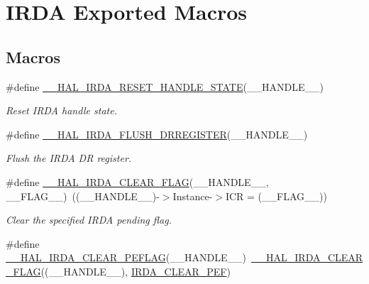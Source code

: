 \hypertarget{group___i_r_d_a___exported___macros}{}\section{I\+R\+DA Exported Macros}
\label{group___i_r_d_a___exported___macros}
\subsection*{Macros}
\begin{DoxyCompactItemize}
\item 
\#define \hyperlink{group___i_r_d_a___exported___macros_ga3cdb66f911dce4c8544139adbb314faa}{\+\_\+\+\_\+\+H\+A\+L\+\_\+\+I\+R\+D\+A\+\_\+\+R\+E\+S\+E\+T\+\_\+\+H\+A\+N\+D\+L\+E\+\_\+\+S\+T\+A\+TE}(\+\_\+\+\_\+\+H\+A\+N\+D\+L\+E\+\_\+\+\_\+)
\begin{DoxyCompactList}\small\item\em Reset I\+R\+DA handle state. \end{DoxyCompactList}\item 
\#define \hyperlink{group___i_r_d_a___exported___macros_ga0c097de13209ede853a30d511cf5a00e}{\+\_\+\+\_\+\+H\+A\+L\+\_\+\+I\+R\+D\+A\+\_\+\+F\+L\+U\+S\+H\+\_\+\+D\+R\+R\+E\+G\+I\+S\+T\+ER}(\+\_\+\+\_\+\+H\+A\+N\+D\+L\+E\+\_\+\+\_\+)
\begin{DoxyCompactList}\small\item\em Flush the I\+R\+DA DR register. \end{DoxyCompactList}\item 
\#define \hyperlink{group___i_r_d_a___exported___macros_ga4ebf474ecfd858f9320bef9bc67c0bce}{\+\_\+\+\_\+\+H\+A\+L\+\_\+\+I\+R\+D\+A\+\_\+\+C\+L\+E\+A\+R\+\_\+\+F\+L\+AG}(\+\_\+\+\_\+\+H\+A\+N\+D\+L\+E\+\_\+\+\_\+,  \+\_\+\+\_\+\+F\+L\+A\+G\+\_\+\+\_\+)~((\+\_\+\+\_\+\+H\+A\+N\+D\+L\+E\+\_\+\+\_\+)-\/$>$Instance-\/$>$I\+CR = (\+\_\+\+\_\+\+F\+L\+A\+G\+\_\+\+\_\+))
\begin{DoxyCompactList}\small\item\em Clear the specified I\+R\+DA pending flag. \end{DoxyCompactList}\item 
\#define \hyperlink{group___i_r_d_a___exported___macros_gae69bd04d655a956dba913c52638de303}{\+\_\+\+\_\+\+H\+A\+L\+\_\+\+I\+R\+D\+A\+\_\+\+C\+L\+E\+A\+R\+\_\+\+P\+E\+F\+L\+AG}(\+\_\+\+\_\+\+H\+A\+N\+D\+L\+E\+\_\+\+\_\+)~\hyperlink{group___i_r_d_a___exported___macros_ga4ebf474ecfd858f9320bef9bc67c0bce}{\+\_\+\+\_\+\+H\+A\+L\+\_\+\+I\+R\+D\+A\+\_\+\+C\+L\+E\+A\+R\+\_\+\+F\+L\+AG}((\+\_\+\+\_\+\+H\+A\+N\+D\+L\+E\+\_\+\+\_\+), \hyperlink{group___i_r_d_a___i_t___c_l_e_a_r___flags_ga1ad61cf6ce6e169e1b7cd9934818bb71}{I\+R\+D\+A\+\_\+\+C\+L\+E\+A\+R\+\_\+\+P\+EF})

\end{DoxyCompactItemize}
